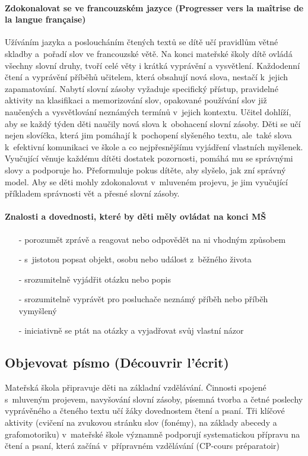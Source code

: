 			\paragraph{Zdokonalovat se ve francouzském jazyce (Progresser vers la maîtrise de la langue française)}
			Užíváním jazyka a posloucháním čtených textů se dítě učí pravidlům větné skladby a pořadí slov ve francouzské větě. Na konci mateřské školy dítě ovládá všechny slovní druhy, tvoří celé věty i krátká vyprávění a vysvětlení. Každodenní čtení a vyprávění příběhů učitelem, která obsahují nová slova, nestačí k jejich zapamatování. Nabytí slovní zásoby vyžaduje specifický přístup, pravidelné aktivity na klasifikaci a memorizování slov, opakované používání slov již naučených a vysvětlování neznámých termínů v jejich kontextu. Učitel dohlíží, aby se každý týden děti naučily nová slova k obohacení slovní zásoby. Děti se učí nejen slovíčka, která jim pomáhají k pochopení slyšeného textu, ale také slova k efektivní komunikaci ve škole a co nejpřesnějšímu vyjádření vlastních myšlenek. Vyučující věnuje každému dítěti dostatek pozornosti, pomáhá mu se správnými slovy a podporuje ho. Přeformuluje pokus dítěte, aby slyšelo, jak zní správný model. Aby se děti mohly zdokonalovat v mluveném projevu, je jim vyučující příkladem správnosti vět a přesné slovní zásoby.

			\paragraph{Znalosti a dovednosti, které by děti měly ovládat na konci MŠ}
			\begin{itemize}
				\setlength\itemsep{-2mm}
				\item[-] porozumět zprávě a reagovat nebo odpovědět na ni vhodným způsobem
				\item[-] s jistotou popsat objekt, osobu nebo událost z běžného života
				\item[-] srozumitelně vyjádřit otázku nebo popis
				\item[-] srozumitelně vyprávět pro posluchače neznámý příběh nebo příběh vymyšlený 
				\item[-] iniciativně se ptát na otázky a vyjadřovat svůj vlastní názor
			\end{itemize}


		\subsection{Objevovat písmo (Découvrir l'écrit)}
			Mateřská škola připravuje děti na základní vzdělávání. Činnosti spojené s mluveným projevem, navyšování slovní zásoby, písemná tvorba a četné poslechy vyprávěného a čteného textu učí žáky dovednostem čtení a psaní. Tři klíčové aktivity (cvičení na zvukovou stránku slov (fonémy), na základy abecedy a grafomotoriku) v mateřské škole významně podporují systematickou přípravu na čtení a psaní, která začíná v přípravném vzdělávání (CP-cours préparatoir)

